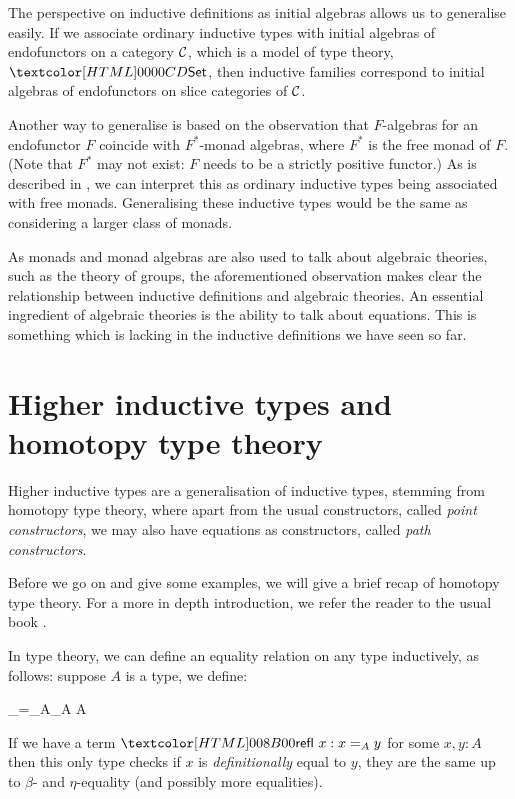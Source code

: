 The perspective on inductive definitions as initial algebras allows us
to generalise easily. If we associate ordinary inductive types with
initial algebras of endofunctors on a category $\mathcal{C}$, which is a model
of type theory, \eg $\Set$, then inductive families correspond to
initial algebras of endofunctors on slice categories of
$\mathcal{C}$. 


Another way to generalise is based on the observation that
$F$-algebras for an endofunctor $F$ coincide with $F^*$-monad
algebras, where $F^*$ is the free monad of $F$. (Note that $F^*$ may
not exist: $F$ needs to be a strictly positive functor.) As is
described in \cite{Shulman2011}, we can interpret this as ordinary
inductive types being associated with free monads. Generalising these
inductive types would be the same as considering a larger class of monads. 

As monads and monad algebras are also used to talk about algebraic
theories, such as the theory of groups, the aforementioned observation
makes clear the relationship between inductive definitions and
algebraic theories. An essential ingredient of algebraic theories is
the ability to talk about equations. This is something which is
lacking in the inductive definitions we have seen so far.

\section{Higher inductive types and homotopy type theory}

Higher inductive types are a generalisation of inductive types,
stemming from homotopy type theory, where apart from the usual
constructors, called \emph{point constructors}, we may also have
equations as constructors, called \emph{path constructors}.

Before we go on and give some examples, we will give a brief recap of
homotopy type theory. For a more in depth introduction, we refer the
reader to the usual book \cite{UFP2013}.

In type theory, we can define an equality relation on any type
inductively, as follows: suppose $A$ is a type, we define:
%
\begin{datatype}{\_=_A\_}{A \to A \to \Type}
\end{datatype}
%
If we have a term $\refl\ x : x =_A y$ for some $x, y : A$ then this
only type checks if $x$ is \emph{definitionally} equal to $y$, \ie
they are the same up to $\beta$- and $\eta$-equality (and possibly
more equalities). 

